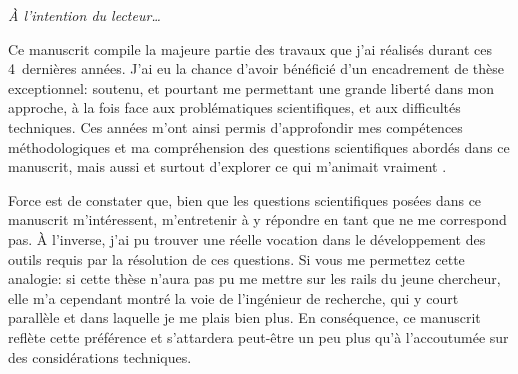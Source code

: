 \begin{comment}

\clearpage
\thispagestyle{thesis-empty}

\section*{Remerciements}
\label{sec:thanks}

la colloc étendu: théo, thomas, arthur, rémi, rémy, clément, sarah
parler du confinement ?
les potos: benjamin, marie, charlie, paul, jessie, piwi

la mifa

mon comité de thèse ? Sakina, Daniele

le 426 le meilleur bureau, tous les autres doctorants et post-doctorants et stagiaires
c'est quand même vachement plus fun avec elleux.

l'équipe admin du labo, bigup
\end{comment}

\clearpage
\thispagestyle{thesis-empty}

\vspace*{5ex}
\par\addvspace{\beforesecskip}\addvspace{\baselineskip}
\par\noindent\textit{À l'intention du lecteur\dots}\par
\vspace{\aftersecskip}

Ce manuscrit compile la majeure partie des travaux que j'ai réalisés durant ces 4~dernières années.
J'ai eu la chance d'avoir bénéficié d'un encadrement de thèse exceptionnel: soutenu, et pourtant me permettant une grande liberté dans mon approche, à la fois face aux problématiques scientifiques, et aux difficultés techniques.
Ces années m'ont ainsi permis d'approfondir mes compétences méthodologiques et ma compréhension des questions scientifiques abordés dans ce manuscrit, mais aussi et surtout d'explorer ce qui m'animait vraiment .

Force est de constater que, bien que les questions scientifiques posées dans ce manuscrit m'intéressent, m'entretenir à y répondre en tant que  ne me correspond pas.
À l'inverse, j'ai pu trouver une réelle vocation dans le développement des outils requis par la résolution de ces questions.
Si vous me permettez cette analogie: si cette thèse n'aura pas pu me mettre sur les rails du jeune chercheur, elle m'a cependant montré la voie de l'ingénieur de recherche, qui y court parallèle et dans laquelle je me plais bien plus.
En conséquence, ce manuscrit reflète cette préférence et s'attardera peut-être un peu plus qu'à l'accoutumée sur des considérations techniques.


